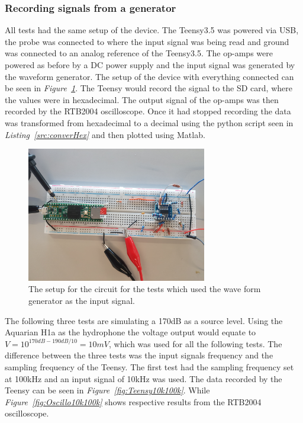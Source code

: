 \subsubsection{Recording signals from a generator}

All tests had the same setup of the device.
The Teensy3.5 was powered via USB, the probe was connected to where the input signal was being read and ground was connected to an analog reference of the Teensy3.5.
The op-amps were powered as before by a DC power supply and the input signal was generated by the waveform generator.
The setup of the device with everything connected can be seen in \textit{Figure~\ref{fig:testCircSetup}}.
The Teensy would record the signal to the SD card, where the values were in hexadecimal.
The output signal of the op-amps was then recorded by the RTB2004 oscilloscope.
Once it had stopped recording the data was transformed from hexadecimal to a decimal using the python script seen in \textit{Listing~\ref{src:converHex}} and then plotted using Matlab.


\begin{figure}[h]
    \centering
    \includegraphics[width=0.7\textwidth]{graphics/TestSetup.jpg}
    \caption{The setup for the circuit for the tests which used the wave form generator as the input signal.}
    \label{fig:testCircSetup}
\end{figure}

The following three tests are simulating a 170dB as a source level.
Using the Aquarian H1a as the hydrophone the voltage output would equate to  $V = 10^{170dB-190dB/10} = 10mV$, which was used for all the following tests.
The difference between the three tests was the input signals frequency and the sampling frequency of the Teensy.
The first test had the sampling frequency set at 100kHz and an input signal of 10kHz was used.
The data recorded by the Teensy can be seen in \textit{Figure~\ref{fig:Teensy10k100k}}.
While \textit{Figure~\ref{fig:Oscillo10k100k}} shows respective results from the RTB2004 oscilloscope.

